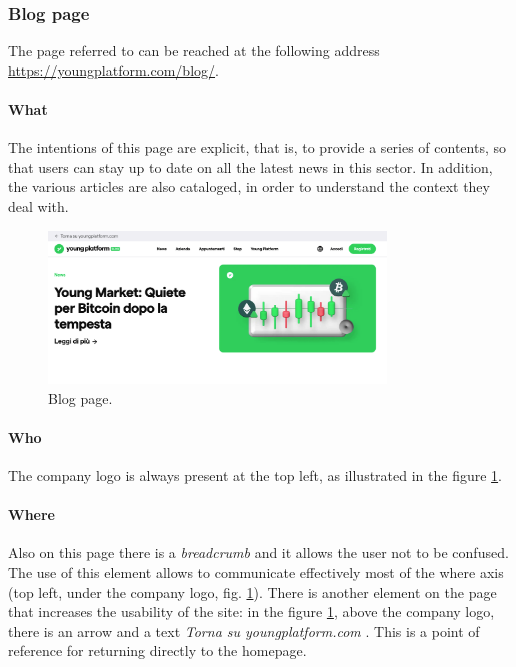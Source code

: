 \subsubsection{Blog page}

The page referred to can be reached at the following address 
\href{https://youngplatform.com/blog/}{https://youngplatform.com/blog/}.

\paragraph{What}

The intentions of this page are explicit, that is, to provide a series of 
contents, so that users can stay up to date on all the latest news in this 
sector. In addition, the various articles are also cataloged, in order to 
understand the context they deal with.

\begin{figure}[H]
  \centering
  \includegraphics[width=0.80\textwidth]{res/images/internal-pages/blog/blog-1.png}
  \caption{Blog page.}
  \label{fig:blog-1}
\end{figure}

\paragraph{Who}

The company logo is always present at the top left, as illustrated
in the figure \ref{fig:blog-1}.

\paragraph{Where}

Also on this page there is a \textit{breadcrumb} and it allows the user 
not to be confused. The use of this element allows to communicate 
effectively most of the where axis (top left, under the company logo, 
fig. \ref{fig:blog-1}). There is another element on the page that 
increases the usability of the site: in the figure \ref{fig:blog-1}, above 
the company logo, there is an arrow and a text 
\textit{Torna su youngplatform.com} . This is a point of reference for 
returning directly to the homepage.

